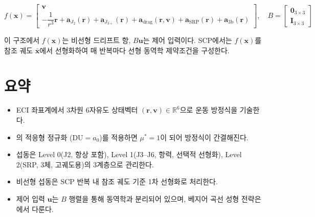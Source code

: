 \documentclass[11pt]{article}
\begin{document}
\begin{equation}
  f(\mathbf{x}) =
  \begin{bmatrix}
    \mathbf{v} \\[4pt]
    -\dfrac{1}{r^3}\mathbf{r}
    + \mathbf{a}_{J_2}(\mathbf{r})
    + \mathbf{a}_{J_{3+}}(\mathbf{r})
    + \mathbf{a}_\mathrm{drag}(\mathbf{r}, \mathbf{v})
    + \mathbf{a}_\mathrm{SRP}(\mathbf{r})
    + \mathbf{a}_{3\mathrm{b}}(\mathbf{r})
  \end{bmatrix},
  \quad
  B =
  \begin{bmatrix} \mathbf{0}_{3\times3} \\ \mathbf{I}_{3\times3} \end{bmatrix}
  \label{eq:f_and_B}
\end{equation}

이 구조에서 $f(\mathbf{x})$는 비선형 드리프트 항, $B\mathbf{u}$는 제어 입력이다.
SCP에서는 $f(\mathbf{x})$를 참조 궤도 $\bar{\mathbf{x}}$에서 선형화하여
매 반복마다 선형 동역학 제약조건을 구성한다.

\section{요약}

\begin{itemize}
  \item ECI 좌표계에서 3차원 6자유도 상태벡터 $(\mathbf{r}, \mathbf{v}) \in \mathbb{R}^6$으로 운동 방정식을 기술한다.
  \item \cite{report001}의 적응형 정규화 ($\mathrm{DU} = a_0$)를 적용하면 $\mu^* = 1$이 되어 방정식이 간결해진다.
  \item 섭동은 Level 0(J2, 항상 포함), Level 1(J3--J6, 항력, 선택적 선형화), Level 2(SRP, 3체, 고궤도용)의 3계층으로 관리한다.
  \item 비선형 섭동은 SCP 반복 내 참조 궤도 기준 1차 선형화로 처리한다.
  \item 제어 입력 $\mathbf{u}$는 $B$ 행렬을 통해 동역학과 분리되어 있으며, 베지어 곡선 성형 전략은 \cite{report003}에서 다룬다.
\end{itemize}



\end{document}

